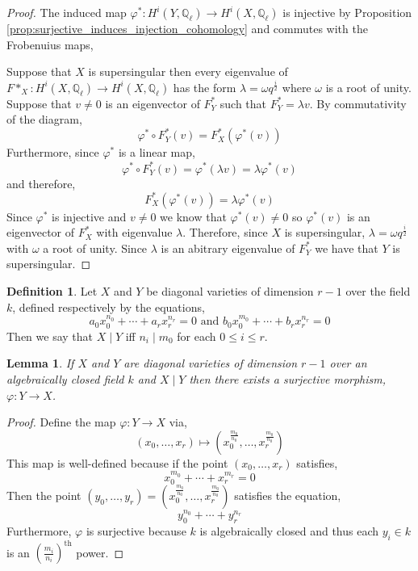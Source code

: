 \documentclass{article}
\newcommand{\Q}{\mathbb{Q}}
\newcommand{\divides}{\mid}
\newtheorem{lemma}[theorem]{Lemma}
\theoremstyle{definition}
\theoremstyle{definition}
\newtheorem{definition}[theorem]{Definition}
\theoremstyle{remark}
\begin{document}
\begin{proof}
The induced map $\varphi^* : H^i(Y, \Q_{\ell}) \to H^i(X, \Q_{\ell})$ is injective by Proposition \ref{prop:surjective_induces_injection_cohomology} and commutes with the Frobenuius maps,
\begin{center}
\end{center}
Suppose that $X$ is supersingular then every eigenvalue of $F*_X : H^i(X, \Q_{\ell}) \to H^i(X, \Q_{\ell})$ has the form $\lambda = \omega q^{\frac{i}{2}}$ where $\omega$ is a root of unity. Suppose that $v \neq 0$ is an eigenvector of $F^*_Y$ such that $F^*_Y = \lambda v$. By commutativity of the diagram,
\[ \varphi^* \circ F^*_Y(v) = F^*_X(\varphi^*(v)) \]
Furthermore, since $\varphi^*$ is a linear map, 
\[ \varphi^* \circ F^*_Y(v) = \varphi^*(\lambda v) = \lambda \varphi^*(v) \]
and therefore,
\[ F^*_X(\varphi^*(v)) = \lambda \varphi^*(v) \]
Since $\varphi^*$ is injective and $v \neq 0$ we know that $\varphi^*(v) \neq 0$ so $\varphi^*(v)$ is an eigenvector of $F^*_X$ with eigenvalue $\lambda$. Therefore, since $X$ is supersingular, $\lambda = \omega q^{\frac{i}{2}}$ with $\omega$ a root of unity. Since $\lambda$ is an abitrary eigenvalue of $F^*_Y$ we have that $Y$ is supersingular. 
\end{proof}

\begin{definition}
Let $X$ and $Y$ be diagonal varieties of dimension $r-1$ over the field $k$, defined respectively by the equations, 
\[ a_0 x_0^{n_0} + \cdots + a_r x_r^{n_r} = 0 \text{ and } b_0 x_0^{m_0} + \cdots + b_r x_r^{n_r} = 0 \]
Then we say that $X \divides Y$ iff $n_i \divides m_0$ for each $0 \le i \le r$. 
\end{definition}


\begin{lemma} \label{lem:if_divides_then_map}
If $X$ and $Y$ are diagonal varieties of dimension $r-1$ over an algebraically closed field $k$ and $X \divides Y$ then there exists a surjective morphism, $\varphi : Y \to X$.  
\end{lemma}

\begin{proof} 
  
Define the map $\varphi : Y \to X$ via,
\[ (x_0, \dots, x_r) \mapsto (x_0^{\frac{m_0}{n_0}}, \dots, x_r^{\frac{m_0}{n_0}}) \]
This map is well-defined because if the point $(x_0, \dots, x_r)$ satisfies,
\[ x_0^{m_0} + \cdots + x_r^{m_r} = 0 \]
Then the point $(y_0, \dots, y_r) = (x_0^{\frac{m_0}{n_0}}, \dots, x_r^{\frac{m_0}{n_0}})$ satisfies the equation,
\[ y_0^{n_0} + \cdots + y_r^{n_r} \]
Furthermore, $\varphi$ is surjective because $k$ is algebraically closed and thus each $y_i \in k$ is an $\left(\frac{m_i}{n_i}\right)^{\mathrm{th}}$ power. 
\end{proof}
\end{document}
